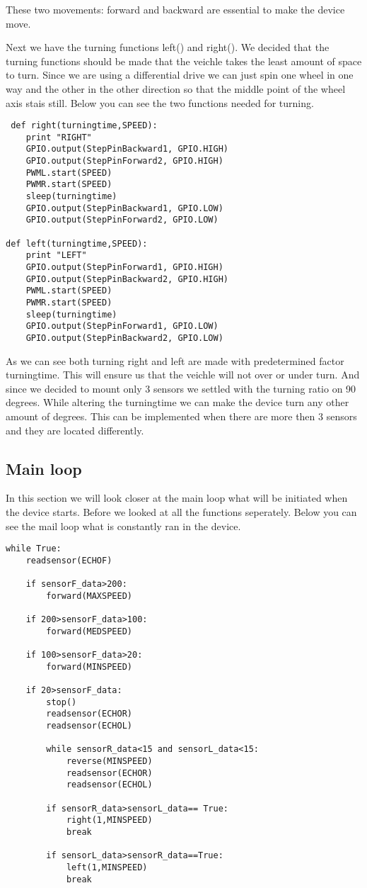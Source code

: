 These two movements: forward and backward are essential to make the device move.

Next we have the turning functions left() and right().
We decided that the turning functions should be made that the veichle takes the least amount of space to turn.
Since we are using a differential drive we can just spin one wheel in one way and the other in the other direction so that the middle point of the wheel axis stais still.
Below you can see the two functions needed for turning.

\begin{lstlisting}
 def right(turningtime,SPEED):
	print "RIGHT"
	GPIO.output(StepPinBackward1, GPIO.HIGH)
	GPIO.output(StepPinForward2, GPIO.HIGH)
	PWML.start(SPEED)
	PWMR.start(SPEED)
	sleep(turningtime)
	GPIO.output(StepPinBackward1, GPIO.LOW)
	GPIO.output(StepPinForward2, GPIO.LOW)

def left(turningtime,SPEED):
	print "LEFT"
	GPIO.output(StepPinForward1, GPIO.HIGH)
	GPIO.output(StepPinBackward2, GPIO.HIGH)
	PWML.start(SPEED)
	PWMR.start(SPEED)
	sleep(turningtime)
	GPIO.output(StepPinForward1, GPIO.LOW)
	GPIO.output(StepPinBackward2, GPIO.LOW)
\end{lstlisting}

As we can see both turning right and left are made with predetermined factor turningtime.
This will ensure us that the veichle will not over or under turn.
And since we decided to mount only 3 sensors we settled with the turning ratio on 90 degrees.
While altering the turningtime we can make the device turn any other amount of degrees.
This can be implemented when there are more then 3 sensors and they are located differently.

\subsection{Main loop}

In this section we will look closer at the main loop what will be initiated when the device starts.
Before we looked at all the functions seperately.
Below you can see the mail loop what is constantly ran in the device.
\begin{lstlisting}
while True:
	readsensor(ECHOF)

	if sensorF_data>200:
		forward(MAXSPEED)
		
	if 200>sensorF_data>100:
		forward(MEDSPEED)

	if 100>sensorF_data>20:
		forward(MINSPEED)

	if 20>sensorF_data:
		stop()
		readsensor(ECHOR)
		readsensor(ECHOL)

		while sensorR_data<15 and sensorL_data<15:	
			reverse(MINSPEED)
			readsensor(ECHOR)
			readsensor(ECHOL)
			
		if sensorR_data>sensorL_data== True:
			right(1,MINSPEED)
			break
			
		if sensorL_data>sensorR_data==True:
			left(1,MINSPEED)
			break
\end{lstlisting}

